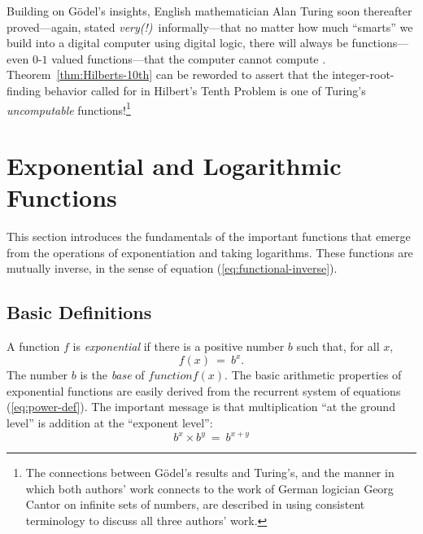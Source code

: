 \noindent
Building on G\"{o}del's insights, English mathematician Alan Turing
 soon thereafter proved---again, stated {\em
  very(!)}~informally---that no matter how much ``smarts'' we build
into a digital computer using digital logic, there will always be
functions---even $0$-$1$ valued functions---that the computer cannot
compute \cite{Turing36}.  Theorem~\ref{thm:Hilberts-10th} can be
reworded to assert that the integer-root-finding behavior called for
in Hilbert's Tenth Problem is one of Turing's {\it uncomputable}
 functions!\footnote{The connections
  between G\"{o}del's results and Turing's, and the manner in which
  both authors' work connects to the work of German logician Georg
  Cantor  on infinite sets of numbers,
  \cite{Cantor74,Cantor78} are described in \cite{Rosenberg09} using
  consistent terminology to discuss all three authors' work.}



\section{Exponential and Logarithmic Functions}
\label{sec:exponential+logarithm}

This section introduces the fundamentals of the important functions
that emerge from the operations of exponentiation and taking
logarithms.  These functions are mutually inverse, in the sense of
equation (\ref{eq:functional-inverse}).

\subsection{Basic Definitions}
\label{sec:exponential-function}


A function $f$ is {\it exponential} if there is a positive number $b$
such that, for all $x$,
\begin{equation}
\label{eq:exponential-defn}
f(x) \ = \ b^x.
\end{equation}
The number $b$ is the {\it base} of
$function f(x)$.  The basic arithmetic properties of exponential
functions are easily derived from the recurrent system of equations
(\ref{eq:power-def}).  The important message is that multiplication
``at the ground level'' is addition at the ``exponent level'':
\[ b^x \times b^y \ = \ b^{x+y} \]




